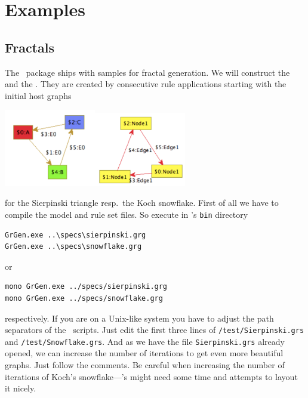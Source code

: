 \chapter{Examples}
\label{anexample}

\section{Fractals}
\label{fractals}
The \GrG\ package ships with samples for fractal generation. We will construct the  and the . They are created by consecutive rule applications starting with the initial host graphs
\begin{center}
\includegraphics[width=4cm]{fig/startsir}\quad\quad\includegraphics[width=4cm]{fig/startkoch}
\end{center}
for the Sierpinski triangle resp.\ the Koch snowflake. 
First of all we have to compile the model and rule set files. So execute in \GrG's \texttt{bin} directory
\begin{verbatim}
GrGen.exe ..\specs\sierpinski.grg
GrGen.exe ..\specs\snowflake.grg
\end{verbatim}
or
\begin{verbatim}
mono GrGen.exe ../specs/sierpinski.grg
mono GrGen.exe ../specs/snowflake.grg
\end{verbatim}
respectively. If you are on a Unix-like system you have to adjust the path separators of the \GrShell\ scripts. Just edit the first three lines of \texttt{/test/Sierpinski.grs} and \texttt{/test/Snowflake.grs}. And as we have the file \texttt{Sierpinski.grs} already opened, we can increase the number of iterations to get even more beautiful graphs. Just follow the comments. Be careful when increasing the number of iterations of Koch's snowflake---\yComp's  might need some time and attempts to layout it nicely.
